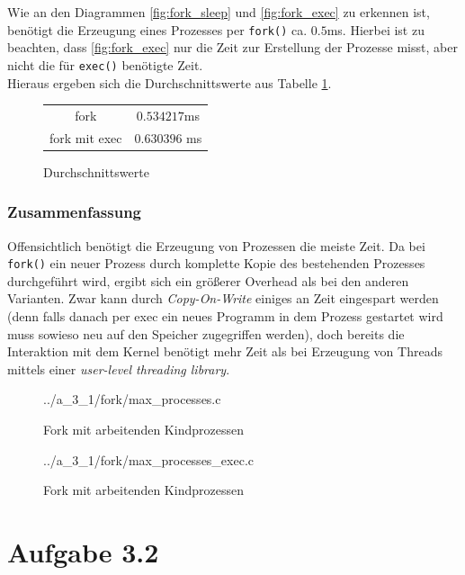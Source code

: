 \documentclass[a4paper,
12pt,
BCOR12mm,
]{scrartcl}
\begin{document}
Wie an den Diagrammen \ref{fig:fork_sleep} und \ref{fig:fork_exec} zu erkennen ist,
benötigt die Erzeugung eines Prozesses per \verb|fork()| ca. $0.5$ms.
Hierbei ist zu beachten, dass \ref{fig:fork_exec} nur die Zeit zur Erstellung der Prozesse
misst, aber nicht die für \verb|exec()| benötigte Zeit. \\
Hieraus ergeben sich die Durchschnittswerte aus Tabelle \ref{fig:fork_mean}.
\begin{figure}[h!]
	\begin{center}
		\begin{tabular}[h!]{c|c}
			\hline
			fork & $0.534217$ms	 \\
			fork mit exec & $0.630396$ ms\\
			\hline
		\end{tabular}
	\end{center}
	\caption{Durchschnittswerte}
	\label{fig:fork_mean}
\end{figure}

\subsubsection{Zusammenfassung}
Offensichtlich benötigt die Erzeugung von Prozessen die meiste Zeit. Da bei
\verb|fork()| ein neuer Prozess durch komplette Kopie des bestehenden Prozesses
durchgeführt wird, ergibt sich ein größerer Overhead als bei den anderen Varianten. Zwar
kann durch \emph{Copy-On-Write} einiges an Zeit eingespart werden (denn falls danach per
exec ein neues Programm in dem Prozess gestartet wird muss sowieso neu auf den Speicher
zugegriffen werden), doch bereits die Interaktion mit dem Kernel benötigt mehr Zeit als
bei Erzeugung von Threads mittels einer \emph{user-level threading library}.

\begin{figure}[h!]
	\begin{center}
		 {../a_3_1/fork/max_processes.c}
	\end{center}
	\caption{Fork mit arbeitenden Kindprozessen}
	\label{fig:fork_listing}
\end{figure}
\begin{figure}[h!]
	\begin{center}
		 {../a_3_1/fork/max_processes_exec.c}
	\end{center}
	\caption{Fork mit arbeitenden Kindprozessen}
	\label{fig:fork_exec_listing}
\end{figure}
\section{Aufgabe 3.2}
\end{document}
